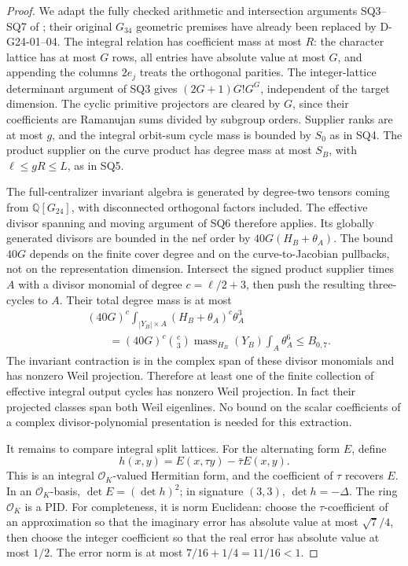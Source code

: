 \begin{proof}
We adapt the fully checked arithmetic and intersection arguments SQ3--SQ7
of \cite{G34:Hecke}; their original \(G_{34}\) geometric premises have
already been replaced by D-G24-01--04.  The integral relation has coefficient
mass at most \(R\): the character lattice has at most \(G\) rows, all
entries have absolute value at most \(G\), and appending the columns
\(2e_j\) treats the orthogonal parities.  The integer-lattice determinant
argument of SQ3 gives \((2G+1)G!G^G\), independent of the target dimension.
The cyclic primitive projectors are cleared by \(G\), since their
coefficients are Ramanujan sums divided by subgroup orders.  Supplier ranks
are at most \(g\), and the integral orbit-sum cycle mass is bounded by
\(S_0\) as in SQ4.  The product supplier on the curve product has degree
mass at most \(S_B\), with \(\ell\le gR\le L\), as in SQ5.

The full-centralizer invariant algebra is generated by degree-two tensors
coming from \(\mathbb Q[G_{24}]\), with disconnected orthogonal factors
included.  The effective divisor spanning and moving argument of SQ6
therefore applies.  Its globally generated divisors are bounded in the nef
order by \(40G(H_B+\theta_A)\).  The bound \(40G\) depends on the finite
cover degree and on the curve-to-Jacobian pullbacks, not on the representation
dimension.  Intersect the signed product supplier times \(A\) with a
divisor monomial of degree \(c=\ell/2+3\), then push the resulting
three-cycles to \(A\).  Their total degree mass is at most
\[
\begin{aligned}
 &(40G)^c\int_{|Y_B|\times A}(H_B+\theta_A)^c\theta_A^3\\
 &\qquad=(40G)^c\binom c3
       \operatorname{mass}_{H_B}(Y_B)\int_A\theta_A^6
 \le B_{0,7}.
\end{aligned}
\]
The invariant contraction is in the complex span of these divisor monomials
and has nonzero Weil projection.  Therefore at least one of the finite
collection of effective integral output cycles has nonzero Weil projection.
In fact their projected classes span both Weil eigenlines.  No bound on
the scalar coefficients of a complex divisor-polynomial presentation is
needed for this extraction.

It remains to compare integral split lattices.  For the alternating form
\(E\), define
\[
                  h(x,y)=E(x,\tau y)-\bar\tau E(x,y).
\]
This is an integral \(\mathcal O_K\)-valued Hermitian form, and the
coefficient of \(\tau\) recovers \(E\).  In an \(\mathcal O_K\)-basis,
\(\det E=(\det h)^2\); in signature \((3,3)\), \(\det h=-\Delta\).
The ring \(\mathcal O_K\) is a PID.  For completeness, it is norm
Euclidean: choose the \(\tau\)-coefficient of an approximation so that the
imaginary error has absolute value at most \(\sqrt7/4\), then choose the
integer coefficient so that the real error has absolute value at most
\(1/2\).  The error norm is at most \(7/16+1/4=11/16<1\).


\end{proof}
